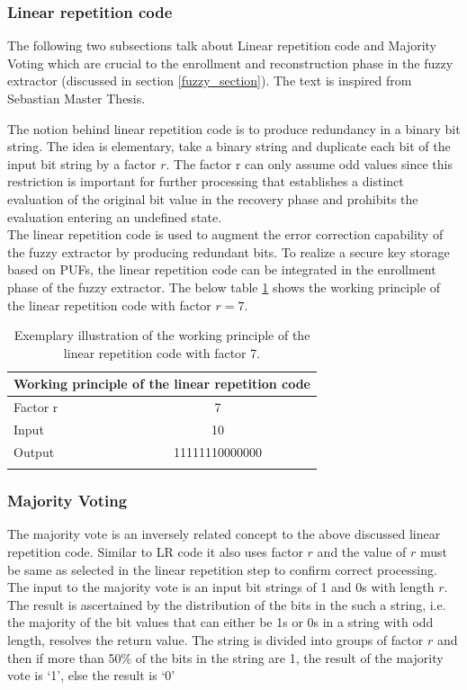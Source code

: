 \subsubsection{Linear repetition code}
\label{fzex_lr}
The following two subsections talk about Linear repetition code and Majority Voting which are crucial to the enrollment and reconstruction phase in the fuzzy extractor (discussed in section \ref{fuzzy_section}). The text is inspired from Sebastian Master Thesis.\cite{71}

The notion behind linear repetition code is to produce redundancy in a binary bit string. The idea is elementary, take a binary string and duplicate each bit of the input bit string by a factor $r$. The factor r can only assume odd values since this restriction is important for further processing that establishes a distinct evaluation of the original bit value in the recovery phase and prohibits the evaluation entering an undefined state.\\

The linear repetition code is used to augment the error correction capability of the fuzzy extractor by producing redundant bits. To realize a secure key storage based on PUFs, the linear repetition code can be integrated in the enrollment phase of the fuzzy extractor. The below table \ref{lr} shows the working principle of the linear repetition code with factor $r = 7$.

\begin{table}[!ht]
\begin{center}
\begin{tabular}{lc}
\toprule
\multicolumn{2}{c}{\textbf{Working principle of the linear repetition code}}\\
\midrule
Factor r & 7\\
Input & 10\\
Output & 11111110000000\\
\addlinespace
\bottomrule
\end{tabular}
\end{center}
\caption{Exemplary illustration of the working principle of the linear repetition code with factor 7.}
\label{lr}
\end{table}

\subsubsection{Majority Voting}
\label{fzex_mv}
The majority vote is an inversely related concept to the above discussed linear repetition code. Similar to LR code it also uses factor $r$ and the value of $r$ must be same as selected in the linear repetition step to confirm correct processing. The input to the majority vote is an input bit strings of 1 and 0s with length $r$. The result is ascertained by the distribution of the bits in the such a string, i.e. the majority of the bit values that can either be 1s or 0s in a string with odd
length, resolves the return value. The string is divided into groups of factor $r$ and then if more than 50\% of the bits in the string are 1, the result of the majority vote is `1', else the result is `0'\\

